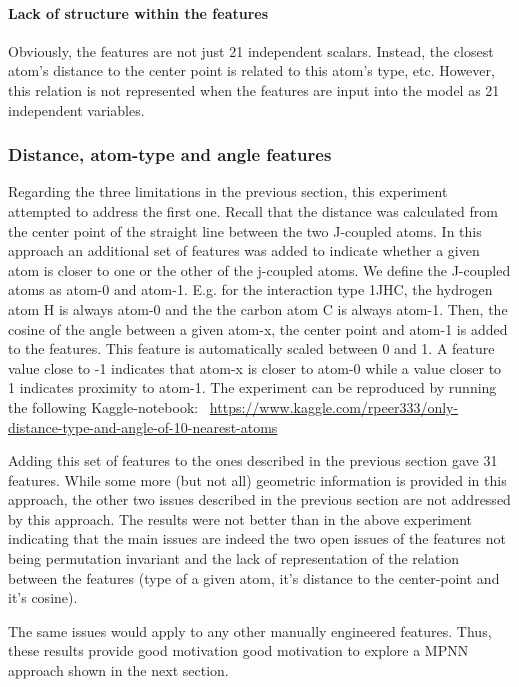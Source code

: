 \paragraph{Lack of structure within the features} Obviously, the features are not just 21 independent scalars. Instead, the closest atom's distance to the center point is related to this atom's type, etc. However, this relation is not represented when the features are input into the model as 21 independent variables.


\subsubsection{Distance, atom-type and angle features}

Regarding the three limitations in the previous section, this experiment attempted to address the first one. Recall that the distance was calculated from the center point of the straight line between the two J-coupled atoms. In this approach an additional set of features was added to indicate whether a given atom is closer to one or the other of the j-coupled atoms. We define the J-coupled atoms as atom-0 and atom-1. E.g. for the interaction type 1JHC, the hydrogen atom H is always atom-0 and the the carbon atom C is always atom-1. Then, the cosine of the angle between a given atom-x, the center point and atom-1 is added to the features. This feature is automatically scaled between 0 and 1. A feature value close to -1 indicates that atom-x is closer to atom-0 while a value closer to 1 indicates proximity to atom-1. The experiment can be reproduced by running the following Kaggle-notebook:~ \url{https://www.kaggle.com/rpeer333/only-distance-type-and-angle-of-10-nearest-atoms}

Adding this set of features to the ones described in the previous section gave 31 features. While some more (but not all) geometric information is provided in this approach, the other two issues described in the previous section are not addressed by this approach. The results were not better than in the above experiment indicating that the main issues are indeed the two open issues of the features not being permutation invariant and the lack of representation of the relation between the features (type of a given atom, it's distance to the center-point and it's cosine).

The same issues would apply to any other manually engineered features. Thus, these results provide good motivation good motivation to explore a MPNN approach shown in the next section.


